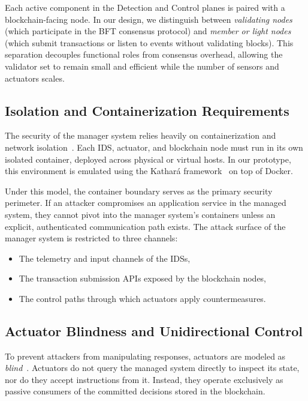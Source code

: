 Each active component in the Detection and Control planes is paired with a blockchain-facing node. In our design, we distinguish between \emph{validating nodes} (which participate in the BFT consensus protocol) and \emph{member or light nodes} (which submit transactions or listen to events without validating blocks). This separation decouples functional roles from consensus overhead, allowing the validator set to remain small and efficient while the number of sensors and actuators scales.

\subsection{Isolation and Containerization Requirements}
\label{subsec:isolation_primitive}

The security of the manager system relies heavily on containerization and network isolation~\cite{albero2026blockchain}. Each IDS, actuator, and blockchain node must run in its own isolated container, deployed across physical or virtual hosts. In our prototype, this environment is emulated using the Kathará framework~\cite{kathara} on top of Docker. 

Under this model, the container boundary serves as the primary security perimeter. If an attacker compromises an application service in the managed system, they cannot pivot into the manager system's containers unless an explicit, authenticated communication path exists. The attack surface of the manager system is restricted to three channels:
\begin{itemize}
    \item The telemetry and input channels of the IDSs,
    \item The transaction submission APIs exposed by the blockchain nodes,
    \item The control paths through which actuators apply countermeasures.
\end{itemize}

\subsection{Actuator Blindness and Unidirectional Control}
\label{subsec:blind_actuators}

To prevent attackers from manipulating responses, actuators are modeled as \emph{blind}~\cite{albero2026blockchain}. Actuators do not query the managed system directly to inspect its state, nor do they accept instructions from it. Instead, they operate exclusively as passive consumers of the committed decisions stored in the blockchain. 

